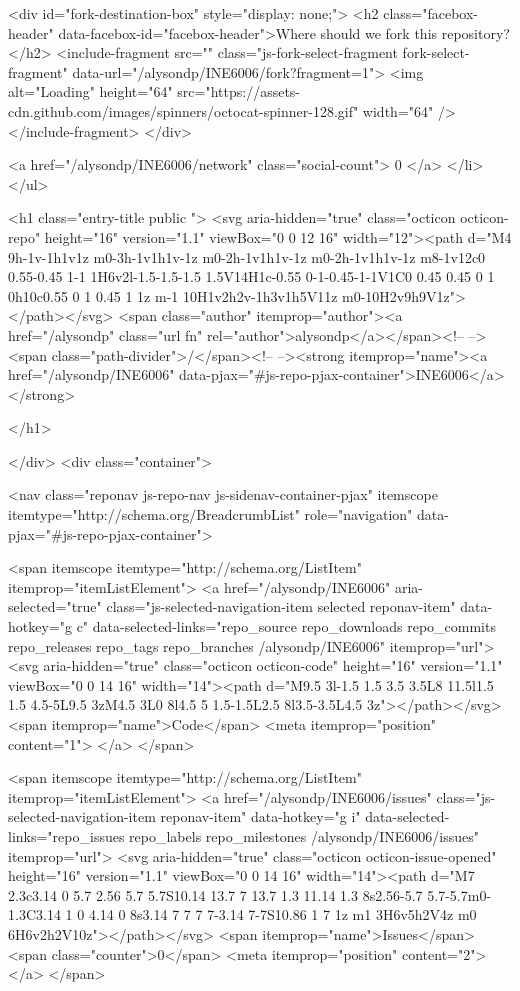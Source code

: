           <div id="fork-destination-box" style="display: none;">
            <h2 class="facebox-header" data-facebox-id="facebox-header">Where should we fork this repository?</h2>
            <include-fragment src=""
                class="js-fork-select-fragment fork-select-fragment"
                data-url="/alysondp/INE6006/fork?fragment=1">
              <img alt="Loading" height="64" src="https://assets-cdn.github.com/images/spinners/octocat-spinner-128.gif" width="64" />
            </include-fragment>
          </div>

    <a href="/alysondp/INE6006/network" class="social-count">
      0
    </a>
  </li>
</ul>

    <h1 class="entry-title public ">
  <svg aria-hidden="true" class="octicon octicon-repo" height="16" version="1.1" viewBox="0 0 12 16" width="12"><path d="M4 9h-1v-1h1v1z m0-3h-1v1h1v-1z m0-2h-1v1h1v-1z m0-2h-1v1h1v-1z m8-1v12c0 0.55-0.45 1-1 1H6v2l-1.5-1.5-1.5 1.5V14H1c-0.55 0-1-0.45-1-1V1C0 0.45 0.45 0 1 0h10c0.55 0 1 0.45 1 1z m-1 10H1v2h2v-1h3v1h5V11z m0-10H2v9h9V1z"></path></svg>
  <span class="author" itemprop="author"><a href="/alysondp" class="url fn" rel="author">alysondp</a></span><!--
--><span class="path-divider">/</span><!--
--><strong itemprop="name"><a href="/alysondp/INE6006" data-pjax="#js-repo-pjax-container">INE6006</a></strong>

</h1>

  </div>
  <div class="container">
    
<nav class="reponav js-repo-nav js-sidenav-container-pjax"
     itemscope
     itemtype="http://schema.org/BreadcrumbList"
     role="navigation"
     data-pjax="#js-repo-pjax-container">

  <span itemscope itemtype="http://schema.org/ListItem" itemprop="itemListElement">
    <a href="/alysondp/INE6006" aria-selected="true" class="js-selected-navigation-item selected reponav-item" data-hotkey="g c" data-selected-links="repo_source repo_downloads repo_commits repo_releases repo_tags repo_branches /alysondp/INE6006" itemprop="url">
      <svg aria-hidden="true" class="octicon octicon-code" height="16" version="1.1" viewBox="0 0 14 16" width="14"><path d="M9.5 3l-1.5 1.5 3.5 3.5L8 11.5l1.5 1.5 4.5-5L9.5 3zM4.5 3L0 8l4.5 5 1.5-1.5L2.5 8l3.5-3.5L4.5 3z"></path></svg>
      <span itemprop="name">Code</span>
      <meta itemprop="position" content="1">
</a>  </span>

    <span itemscope itemtype="http://schema.org/ListItem" itemprop="itemListElement">
      <a href="/alysondp/INE6006/issues" class="js-selected-navigation-item reponav-item" data-hotkey="g i" data-selected-links="repo_issues repo_labels repo_milestones /alysondp/INE6006/issues" itemprop="url">
        <svg aria-hidden="true" class="octicon octicon-issue-opened" height="16" version="1.1" viewBox="0 0 14 16" width="14"><path d="M7 2.3c3.14 0 5.7 2.56 5.7 5.7S10.14 13.7 7 13.7 1.3 11.14 1.3 8s2.56-5.7 5.7-5.7m0-1.3C3.14 1 0 4.14 0 8s3.14 7 7 7 7-3.14 7-7S10.86 1 7 1z m1 3H6v5h2V4z m0 6H6v2h2V10z"></path></svg>
        <span itemprop="name">Issues</span>
        <span class="counter">0</span>
        <meta itemprop="position" content="2">
</a>    </span>

